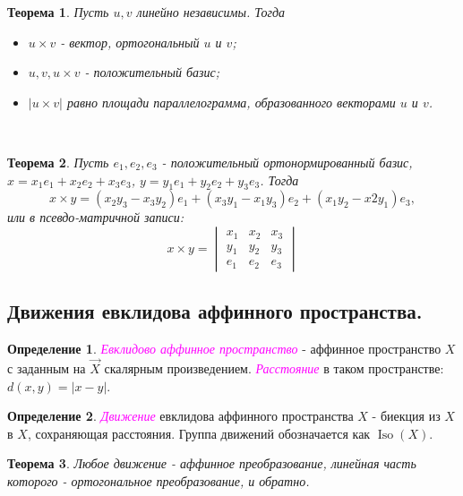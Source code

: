 \documentclass[a4paper,100pt]{article}
\theoremstyle{indented}
\newtheorem{theorem}{Теорема}
\theoremstyle{definition}
\newtheorem{defn}{Определение}
\theoremstyle{remark}
\DeclareMathOperator{\Iso}{Iso}
\begin{document}
\begin{theorem}
    Пусть $u, v$ линейно независимы. Тогда 
    
    \begin{itemize}
        \item $u\times v$ - вектор, ортогональный $u$ и $v$; 
        \item $u, v, u\times v$ - положительный базис; 
        \item $|u\times v|$ равно площади параллелограмма, образованного векторами $u$ и $v$. 
    \end{itemize}
\end{theorem} \ 

\begin{theorem}
    Пусть $e_1, e_2, e_3$ - положительный ортонормированный базис, $x=x_1e_1+x_2e_2+x_3e_3$, $y=y_1e_1+y_2e_2+y_3e_3$. Тогда 
    \[
        x\times y = (x_2y_3-x_3y_2)e_1+(x_3y_1-x_1y_3)e_2+(x_1y_2-x2y_1)e_3, 
    \]
    или в псевдо-матричной записи:
    \begin{equation*}
        x\times y = 
        \begin{vmatrix}
            x_1 & x_2 & x_3 \\
            y_1 & y_2 & y_3 \\
            e_1 & e_2 & e_3 
        \end{vmatrix}
    \end{equation*}
\end{theorem}

\subsection{Движения евклидова аффинного пространства.}

\begin{defn}
    \textit{\textcolor{magenta}{\hypertarget{s84}{Евклидово аффинное пространство}}} - аффинное пространство $X$ с заданным на $\vec{X}$ скалярным произведением. \textit{\textcolor{magenta}{\hypertarget{s85}{Расстояние}}} в таком пространстве: $d(x, y)=|x-y|$. 
\end{defn}

\begin{defn}
    \textit{\textcolor{magenta}{\hypertarget{s86}{Движение}}} евклидова аффинного пространства $X$ - биекция из $X$ в $X$, сохраняющая расстояния. Группа движений обозначается как $\Iso(X)$.
\end{defn}

\begin{theorem}
    Любое движение - аффинное преобразование, линейная часть которого - ортогональное преобразование, и обратно.
\end{theorem} 
\end{document}
